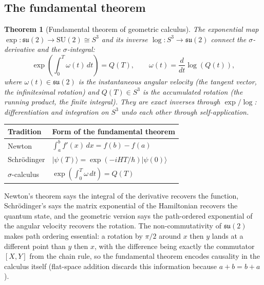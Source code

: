 \documentclass[12pt]{article}
\newtheorem{theorem}{Theorem}[section]
\begin{document}
\subsection{The fundamental theorem}

\begin{theorem}[Fundamental theorem of geometric calculus]
    The exponential map $\exp: \mathfrak{su}(2) \to \mathrm{SU}(2) \cong S^3$ and its inverse $\log: S^3 \to \mathfrak{su}(2)$ connect the $\sigma$-derivative and the $\sigma$-integral:
    \begin{equation}
        \exp\!\left(\int_0^T \omega(t)\, dt\right) = Q(T), \qquad \omega(t) = \frac{d}{dt}\log(Q(t)),
    \end{equation}
    where $\omega(t) \in \mathfrak{su}(2)$ is the instantaneous angular velocity (the tangent vector, the infinitesimal rotation) and $Q(T) \in S^3$ is the accumulated rotation (the running product, the finite integral). They are exact inverses through $\exp/\log$: differentiation and integration on $S^3$ undo each other through self-application.
\end{theorem}

\begin{center}
\begin{tabular}{l l}
    \toprule
    Tradition & Form of the fundamental theorem \\
    \midrule
    Newton & $\int_a^b f'(x)\,dx = f(b) - f(a)$ \\[4pt]
    Schr\"odinger & $|\psi(T)\rangle = \exp(-iHT/\hbar)|\psi(0)\rangle$ \\[4pt]
    $\sigma$-calculus & $\exp\!\left(\int_0^T \omega\, dt\right) = Q(T)$ \\
    \bottomrule
\end{tabular}
\end{center}

Newton's theorem says the integral of the derivative recovers the function, Schr\"odinger's says the matrix exponential of the Hamiltonian recovers the quantum state, and the geometric version says the path-ordered exponential of the angular velocity recovers the rotation. The non-commutativity of $\mathfrak{su}(2)$ makes path ordering essential: a rotation by $\pi/2$ around $x$ then $y$ lands at a different point than $y$ then $x$, with the difference being exactly the commutator $[X,Y]$ from the chain rule, so the fundamental theorem encodes causality in the calculus itself (flat-space addition discards this information because $a + b = b + a$).
\end{document}
